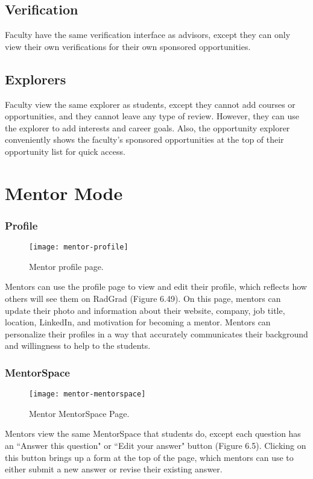 \subsection{Verification}
Faculty have the same verification interface as advisors, except they can only view their own verifications for their own sponsored opportunities. 
\subsection{Explorers}
Faculty view the same explorer as students, except they cannot add courses or opportunities, and they cannot leave any type of review. However, they can use the explorer to add interests and career goals. Also, the opportunity explorer conveniently shows the faculty's sponsored opportunities at the top of their opportunity list for quick access.

\section{Mentor Mode}
\subsubsection{Profile}
\begin{figure}[htbp!]
\centering
\texttt{[image: mentor-profile]}
\caption{Mentor profile page.}
\end{figure}
Mentors can use the profile page to view and edit their profile, which reflects how others will see them on RadGrad (Figure 6.49). On this page, mentors can update their photo and information about their website, company, job title, location, LinkedIn, and motivation for becoming a mentor. Mentors can personalize their profiles in a way that accurately communicates their background and willingness to help to the students. 
\subsubsection{MentorSpace}
\begin{figure}[htbp!]
\centering
\texttt{[image: mentor-mentorspace]}
\caption{Mentor MentorSpace Page.}
\end{figure}
Mentors view the same MentorSpace that students do, except each question has an ``Answer this question" or ``Edit your answer" button (Figure 6.5). Clicking on this button brings up a form at the top of the page, which mentors can use to either submit a new answer or revise their existing answer. 
